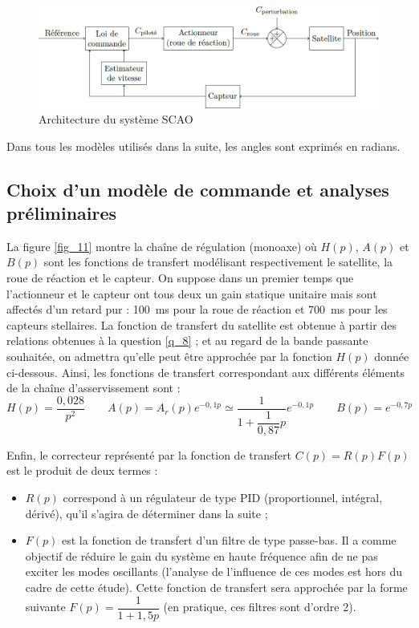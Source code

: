 \begin{figure}[H]
\centering
\includegraphics[width=.8\linewidth]{images/fig_10}
\caption{Architecture du système SCAO \label{fig_10}}
\end{figure}

Dans tous les modèles utilisés dans la suite, les angles sont exprimés en radians.

\fi

\subsection{\label{sec:3:A} Choix d’un modèle de commande et analyses préliminaires}

\ifprof
\else


La figure \autoref{fig_11} montre la chaîne de régulation (monoaxe) où $H(p)$, $A(p)$ et $B(p)$ sont les fonctions de transfert
modélisant respectivement le satellite, la roue de réaction et le capteur. On suppose dans un premier temps que
l’actionneur et le capteur ont tous deux un gain statique unitaire mais sont affectés d’un retard pur : \SI{100}{ms}
pour la roue de réaction et \SI{700}{ms} pour les capteurs stellaires. La fonction de transfert du satellite est obtenue à
partir des relations obtenues à la question \ref{q_8} ; et au regard de la bande passante souhaitée, on admettra qu’elle
peut être approchée par la fonction $H(p)$ donnée ci-dessous. Ainsi, les fonctions de transfert correspondant aux
différents éléments de la chaîne d’asservissement sont :
$$
H(p)=\dfrac{0,028}{p^2} 
\quad \quad 
A(p)=A_r (p) e^{-0,1p}\simeq \dfrac{1}{1+\dfrac{1}{0,87}p}e^{-0,1 p} 
\quad \quad 
B(p)=e^{-0,7p}
$$


Enfin, le correcteur représenté par la fonction de transfert $C(p) = R(p) F(p)$ est le produit de deux termes :
\begin{itemize}
\item $R(p)$ correspond à un régulateur de type PID (proportionnel, intégral, dérivé), qu’il s’agira de déterminer
dans la suite ;
\item $F(p)$ est la fonction de transfert d’un filtre de type passe-bas. Il a comme objectif de réduire le gain du système
en haute fréquence afin de ne pas exciter les modes oscillants (l’analyse de l’influence de ces modes est hors
du cadre de cette étude). Cette fonction de transfert sera approchée par la forme suivante 
$F(p) = \dfrac{1}{1 + 1,5p}$ (en pratique, ces filtres sont d’ordre 2).
\end{itemize}
\fi

